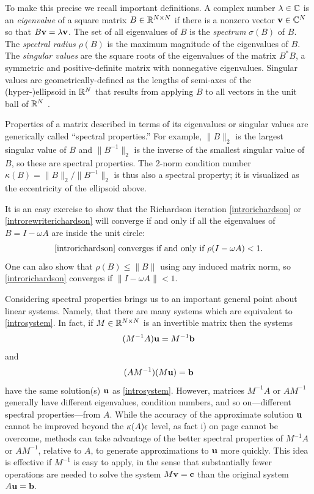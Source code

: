 To make this precise we recall important definitions.  A complex number $\lambda \in \mathbb{C}$ is an \emph{eigenvalue} of a square matrix $B\in\mathbb{R}^{N\times N}$ if there is a nonzero vector $\mathbf{v}\in\mathbb{C}^N$ so that $B \mathbf{v} = \lambda \mathbf{v}$.  The set of all eigenvalues of $B$ is the \emph{spectrum} $\sigma(B)$ of $B$.  The \emph{spectral radius} $\rho(B)$ is the maximum magnitude of the eigenvalues of $B$.  The \emph{singular values} are the square roots of the eigenvalues of the matrix $B^*B$, a symmetric and positive-definite matrix with nonnegative eigenvalues.  Singular values are geometrically-defined as the lengths of semi-axes of the (hyper-)ellipsoid in $\mathbb{R}^N$ that results from applying $B$ to all vectors in the unit ball of $\mathbb{R}^N$ \citep{TrefethenBau}.

Properties of a matrix described in terms of its eigenvalues or singular values are generically called ``spectral properties.''  For example, $\|B\|_2$ is the largest singular value of $B$ and $\|B^{-1}\|_2$ is the inverse of the smallest singular value of $B$, so these are spectral properties.  The 2-norm condition number $\kappa(B)=\|B\|_2/\|B^{-1}\|_2$ is thus also a spectral property; it is visualized as the eccentricity of the ellipsoid above.

It is an easy exercise to show that the Richardson iteration \eqref{introrichardson} or \eqref{introrewriterichardson} will converge if and only if all the eigenvalues of $B=I-\omega A$ are inside the unit circle:
\begin{equation}
\text{\eqref{introrichardson} converges if and only if } \rho(I-\omega A) < 1. \label{introconvergethm}
\end{equation}
One can also show that $\rho(B) \le \|B\|$ using any induced matrix norm, so \eqref{introrichardson} converges if $\|I-\omega A\| < 1$.

Considering spectral properties brings us to an important general point about linear systems.  Namely, that there are many systems which are equivalent to \eqref{introsystem}.  In fact, if $M\in\mathbb{R}^{N\times N}$ is an invertible matrix then the systems
\begin{equation}
(M^{-1} A) \mathbf{u} = M^{-1} \mathbf{b} \label{introleftpre}
\end{equation}
and
\begin{equation}
(A M^{-1}) (M\mathbf{u}) = \mathbf{b} \label{introrightpre}
\end{equation}
have the same solution(s) $\mathbf{u}$ as \eqref{introsystem}.  However, matrices $M^{-1} A$ or $A M^{-1}$ generally have different eigenvalues, condition numbers, and so on---different spectral properties---from $A$.  While the accuracy of the approximate solution $\mathbf{u}$ cannot be improved beyond the $\kappa(A) \epsilon$ level, as fact i) on page \pageref{limittoaccuracy} cannot be overcome, methods can take advantage of the better spectral properties of $M^{-1} A$ or $A M^{-1}$, relative to $A$, to generate approximations to $\mathbf{u}$ more quickly.  This idea is effective if $M^{-1}$ is easy to apply, in the sense that substantially fewer operations are needed to solve the system $M\mathbf{v}=\mathbf{c}$ than the original system $A\mathbf{u}=\mathbf{b}$.

